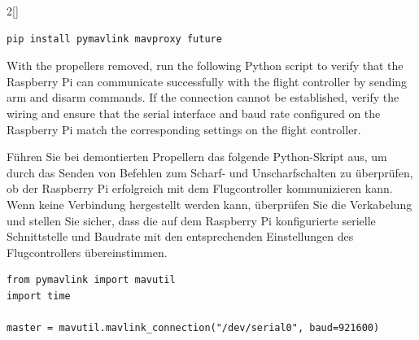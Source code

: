\begin{paracol}{2}[]

\begin{lstlisting}[style=shell]
pip install pymavlink mavproxy future
\end{lstlisting}

\renewcommand{\deutschertitel}{Grundlegende Fahrzeugsteuerung mit dem Begleitcomputer testen}
\renewcommand{\englischertitel}{Testing Basic Vehicle Control from a Companion Computer}
\makrounterabschnitt

With the propellers removed, run the following Python script to verify that the Raspberry Pi can communicate successfully with the flight controller by sending arm and disarm commands. If the connection cannot be established, verify the wiring and ensure that the serial interface and baud rate configured on the Raspberry Pi match the corresponding settings on the flight controller.

\colger

Führen Sie bei demontierten Propellern das folgende Python-Skript aus, um durch das Senden von Befehlen zum Scharf- und Unscharfschalten zu überprüfen, ob der Raspberry Pi erfolgreich mit dem Flugcontroller kommunizieren kann. Wenn keine Verbindung hergestellt werden kann, überprüfen Sie die Verkabelung und stellen Sie sicher, dass die auf dem Raspberry Pi konfigurierte serielle Schnittstelle und Baudrate mit den entsprechenden Einstellungen des Flugcontrollers übereinstimmen.

\colende


\begin{lstlisting}[style=shell]
from pymavlink import mavutil
import time

master = mavutil.mavlink_connection("/dev/serial0", baud=921600)


\end{lstlisting}
\end{paracol}
